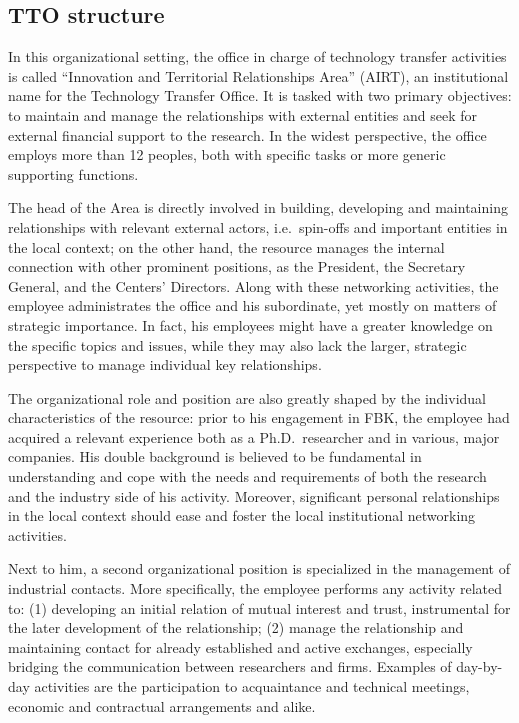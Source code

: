 \subsection{TTO structure}

In this organizational setting, the office in charge of technology transfer activities is called \enquote{Innovation and Territorial Relationships Area} (AIRT), an institutional name for the Technology Transfer Office. It is tasked with two primary objectives: to maintain and manage the relationships with external entities and seek for external financial support to the research. In the widest perspective, the office employs more than 12 peoples, both with specific tasks or more generic supporting functions. 

The head of the Area is directly involved in building, developing and maintaining relationships with relevant external actors, i.e.\ spin-offs and important entities in the local context; on the other hand, the resource manages the internal connection with other prominent positions, as the President, the Secretary General, and the Centers' Directors. Along with these networking activities, the employee administrates the office and his subordinate, yet mostly on matters of strategic importance. In fact, his employees might have a greater knowledge on the specific topics and issues, while they may also lack the larger, strategic perspective to manage individual key relationships.

The organizational role and position are also greatly shaped by the individual characteristics of the resource: prior to his engagement in FBK, the employee had acquired a relevant experience both as a Ph.D.\ researcher and in various, major companies. His double background is believed to be fundamental in understanding and cope with the needs and requirements of both the research and the industry side of his activity. Moreover, significant personal relationships in the local context should ease and foster the local institutional networking activities.

Next to him, a second organizational position is specialized in the management of industrial contacts. More specifically, the employee performs any activity related to: (1) developing an initial relation of mutual interest and trust, instrumental for the later development of the relationship; (2) manage the relationship and maintaining contact for already established and active exchanges, especially bridging the communication between researchers and firms. Examples of day-by-day activities are the participation to acquaintance and technical meetings, economic and contractual arrangements and alike.

